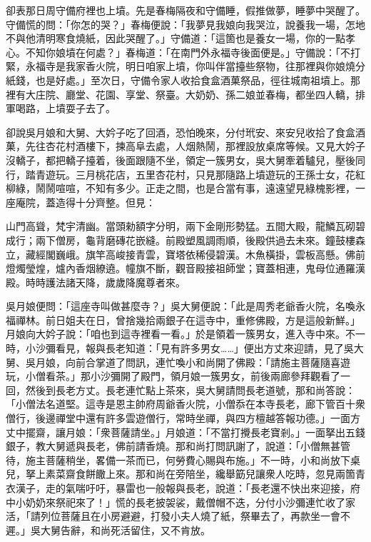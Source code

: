 卻表那日周守備府裡也上墳。先是春梅隔夜和守備睡，假推做夢，睡夢中哭醒了。{}守備慌的問：「你怎的哭？」春梅便說：「我夢見我娘向我哭泣，說養我一場，怎地不與他清明寒食燒紙，因此哭醒了。」守備道：「這箇也是養女一場，你的一點孝心。不知你娘墳在何處？」春梅道：「在南門外永福寺後面便是。」守備說：「不打緊，永福寺是我家香火院，明日咱家上墳，你叫伴當擡些祭物，往那裡與你娘燒分紙錢，也是好處。」至次日，守備令家人收拾食盒酒菓祭品，徑往城南祖墳上。那裡有大庄院、廳堂、花園、享堂、祭臺。大奶奶、孫二娘並春梅，都坐四人轎，排軍喝路，上墳耍子去了。

卻說吳月娘和大舅、大妗子吃了回酒，恐怕晚來，分付玳安、來安兒收拾了食盒酒菓，先往杏花村酒樓下，揀高阜去處，人烟熱鬧，那裡設放桌席等候。又見大妗子沒轎子，都把轎子擡着，後面跟隨不坐，領定一簇男女，吳大舅牽着驢兒，壓後同行，踏青遊玩。三月桃花店，五里杏花村，只見那隨路上墳遊玩的王孫士女，花紅柳綠，鬧鬧喧喧，不知有多少。正走之間，也是合當有事，遠遠望見綠槐影裡，一座庵院，蓋造得十分齊整。但見：

\begin{myquote}
山門高聳，梵宇清幽。當頭勑額字分明，兩下金剛形勢猛。五間大殿，龍鱗瓦砌碧成行；兩下僧房，龜背磨磚花嵌縫。前殿塑風調雨順，後殿供過去未來。鐘鼓樓森立，藏經閣巍峨。旗竿高峻接青雲，寶塔依稀侵碧漢。木魚橫掛，雲板高懸。佛前燈燭瑩煌，爐內香烟繚遶。幢旗不斷，觀音殿接祖師堂；寶蓋相連，鬼母位通羅漢殿。時時護法諸天降，歲歲降魔尊者來。
\end{myquote}

吳月娘便問：「這座寺叫做甚麼寺？」吳大舅便說：「此是周秀老爺香火院，名喚永福禪林。前日姐夫在日，曾捨幾拾兩銀子在這寺中，重修佛殿，方是這般新鮮。」月娘向大妗子說：「咱也到這寺裡看一看。」於是領着一簇男女，進入寺中來。不一時，小沙彌看見，報與長老知道：「見有許多男女……」便出方丈來迎請，見了吳大舅、吳月娘，向前合掌道了問訊，連忙喚小和尚開了佛殿：「請施主菩薩隨喜遊玩，小僧看茶。」那小沙彌開了殿門，領月娘一簇男女，前後兩廊參拜觀看了一回，然後到長老方丈。長老連忙點上茶來，吳大舅請問長老道號，那和尚答說：「小僧法名道堅。這寺是恩主帥府周爺香火院，小僧忝在本寺長老，廊下管百十衆僧行，後邊禪堂中還有許多雲遊僧行，常時坐禪，{}與四方檀越答報功德。」一面方丈中擺齋，讓月娘：「衆菩薩請坐。」月娘道：「不當打攪長老寶剎。」一面拏出五錢銀子，教大舅遞與長老，佛前請香燒。那和尚打問訊謝了，說道：「小僧無甚管待，施主菩薩稍坐，畧備一茶而已，何勞費心賜與布施。」不一時，小和尚放下桌兒，拏上素菜齋食餅饊上來。那和尚在旁陪坐，纔舉筯兒讓衆人吃時，忽見兩箇青衣漢子，走的氣喘吁吁，暴雷也一般報與長老，說道：「長老還不快出來迎接，府中小奶奶來祭祀來了！」慌的長老披袈裟，戴僧帽不迭，分付小沙彌連忙收了家活，「請列位菩薩且在小房避避，打發小夫人燒了紙，祭畢去了，再款坐一會不遲。」吳大舅告辭，和尚死活留住，又不肯放。


